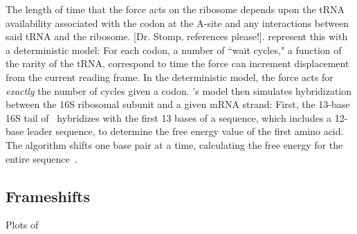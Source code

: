 \documentclass[12pt]{article}
\numberwithin{equation}{section}
\begin{document}
The length of time that the force acts on the ribosome depends upon
the tRNA availability associated with the codon at the A-site 
and any interactions between said tRNA and the ribosome. [Dr. Stomp, references please!].
\citeauthor{lalit:mechanics} represent this with a deterministic model: For each codon,
a number of ``wait cycles," a function of the rarity of the
tRNA, correspond to time the force can
increment displacement from the current reading frame.  In the
deterministic model, the force acts for \emph{exactly} the number
of cycles given a codon. \cite{lalit:mechanics}'s model then simulates hybridization between the
16S ribosomal subunit and a given mRNA strand: First, the 13-base 16S
tail of \ecoli\ hybridizes with the first 13 bases of a sequence,
which includes a 12-base leader sequence, to determine the free energy 
value of the first amino acid. The algorithm shifts one base pair at a time, 
calculating the free energy for the entire sequence~\cite{starmer}.

\subsection{Frameshifts}
\label{section:frameshifts}

\begin{cfigure}
  \caption{Plots of~\prfB}
  \label{prfB:detplots}
\end{cfigure}
\end{document}
